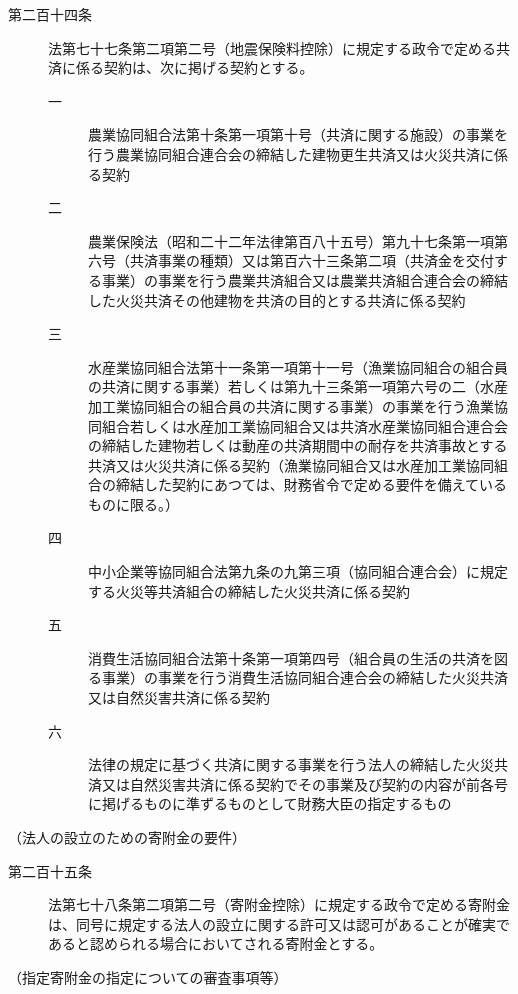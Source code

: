 \documentclass[twocolumn,a4j,10pt]{ltjtarticle}
\begin{document}
\begin{description}
\item[第二百十四条]法第七十七条第二項第二号（地震保険料控除）に規定する政令で定める共済に係る契約は、次に掲げる契約とする。
\begin{description}
\item[一]農業協同組合法第十条第一項第十号（共済に関する施設）の事業を行う農業協同組合連合会の締結した建物更生共済又は火災共済に係る契約
\item[二]農業保険法（昭和二十二年法律第百八十五号）第九十七条第一項第六号（共済事業の種類）又は第百六十三条第二項（共済金を交付する事業）の事業を行う農業共済組合又は農業共済組合連合会の締結した火災共済その他建物を共済の目的とする共済に係る契約
\item[三]水産業協同組合法第十一条第一項第十一号（漁業協同組合の組合員の共済に関する事業）若しくは第九十三条第一項第六号の二（水産加工業協同組合の組合員の共済に関する事業）の事業を行う漁業協同組合若しくは水産加工業協同組合又は共済水産業協同組合連合会の締結した建物若しくは動産の共済期間中の耐存を共済事故とする共済又は火災共済に係る契約（漁業協同組合又は水産加工業協同組合の締結した契約にあつては、財務省令で定める要件を備えているものに限る。）
\item[四]中小企業等協同組合法第九条の九第三項（協同組合連合会）に規定する火災等共済組合の締結した火災共済に係る契約
\item[五]消費生活協同組合法第十条第一項第四号（組合員の生活の共済を図る事業）の事業を行う消費生活協同組合連合会の締結した火災共済又は自然災害共済に係る契約
\item[六]法律の規定に基づく共済に関する事業を行う法人の締結した火災共済又は自然災害共済に係る契約でその事業及び契約の内容が前各号に掲げるものに準ずるものとして財務大臣の指定するもの
\end{description}
\end{description}
\noindent\hspace{10pt}（法人の設立のための寄附金の要件）
\begin{description}
\item[第二百十五条]法第七十八条第二項第二号（寄附金控除）に規定する政令で定める寄附金は、同号に規定する法人の設立に関する許可又は認可があることが確実であると認められる場合においてされる寄附金とする。
\end{description}
\noindent\hspace{10pt}（指定寄附金の指定についての審査事項等）
\end{document}
